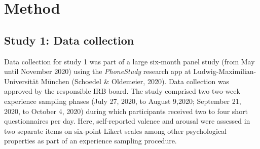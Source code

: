 \documentclass[
  english,
  man,floatsintext]{apa6}
\begin{document}
\newpage

\hypertarget{method}{%
\section{Method}\label{method}}

\hypertarget{study-1-data-collection}{%
\subsection{Study 1: Data collection}\label{study-1-data-collection}}

Data collection for study 1 was part of a large six-month panel study (from May until November 2020) using the \emph{PhoneStudy} research app at Ludwig-Maximilian-Universität München (Schoedel \& Oldemeier, 2020). Data collection was approved by the responsible IRB board. The study comprised two two-week experience sampling phases (July 27, 2020, to August 9,2020; September 21, 2020, to October 4, 2020) during which participants received two to four short questionnaires per day. Here, self-reported valence and arousal were assessed in two separate items on six-point Likert scales among other psychological properties as part of an experience sampling procedure.
\end{document}
